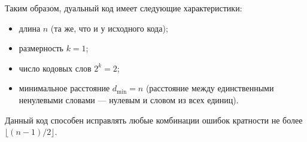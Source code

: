 \documentclass{article}
\begin{document}
Таким образом, дуальный код имеет следующие характеристики:
\begin{itemize}
    \item длина $n$ (та же, что и у исходного кода);
    \item размерность $k = 1$;
    \item число кодовых слов $2^k = 2$;
    \item минимальное расстояние $d_{\min} = n$ (расстояние между единственными ненулевыми словами — нулевым и словом из всех единиц).
\end{itemize}

Данный код способен исправлять любые комбинации ошибок кратности не более $\lfloor (n-1)/2 \rfloor$.
\end{document}
